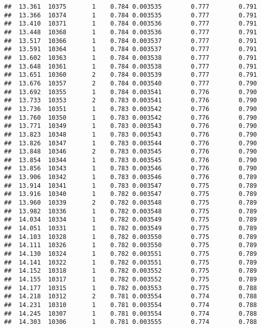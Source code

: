 \documentclass[
]{book}
\begin{document}
\begin{verbatim}
##  13.361  10375       1    0.784 0.003535        0.777        0.791
##  13.366  10374       1    0.784 0.003535        0.777        0.791
##  13.410  10371       1    0.784 0.003536        0.777        0.791
##  13.448  10368       1    0.784 0.003536        0.777        0.791
##  13.517  10366       1    0.784 0.003537        0.777        0.791
##  13.591  10364       1    0.784 0.003537        0.777        0.791
##  13.602  10363       1    0.784 0.003538        0.777        0.791
##  13.648  10361       1    0.784 0.003538        0.777        0.791
##  13.651  10360       2    0.784 0.003539        0.777        0.791
##  13.676  10357       2    0.784 0.003540        0.777        0.790
##  13.692  10355       1    0.784 0.003541        0.776        0.790
##  13.733  10353       2    0.783 0.003541        0.776        0.790
##  13.736  10351       1    0.783 0.003542        0.776        0.790
##  13.760  10350       1    0.783 0.003542        0.776        0.790
##  13.771  10349       1    0.783 0.003543        0.776        0.790
##  13.823  10348       1    0.783 0.003543        0.776        0.790
##  13.826  10347       1    0.783 0.003544        0.776        0.790
##  13.848  10346       2    0.783 0.003545        0.776        0.790
##  13.854  10344       1    0.783 0.003545        0.776        0.790
##  13.856  10343       1    0.783 0.003546        0.776        0.790
##  13.906  10342       1    0.783 0.003546        0.776        0.789
##  13.914  10341       1    0.783 0.003547        0.775        0.789
##  13.916  10340       1    0.782 0.003547        0.775        0.789
##  13.960  10339       2    0.782 0.003548        0.775        0.789
##  13.982  10336       1    0.782 0.003548        0.775        0.789
##  14.034  10334       1    0.782 0.003549        0.775        0.789
##  14.051  10331       1    0.782 0.003549        0.775        0.789
##  14.103  10328       1    0.782 0.003550        0.775        0.789
##  14.111  10326       1    0.782 0.003550        0.775        0.789
##  14.130  10324       1    0.782 0.003551        0.775        0.789
##  14.141  10322       1    0.782 0.003551        0.775        0.789
##  14.152  10318       1    0.782 0.003552        0.775        0.789
##  14.155  10317       1    0.782 0.003552        0.775        0.789
##  14.177  10315       1    0.782 0.003553        0.775        0.788
##  14.218  10312       2    0.781 0.003554        0.774        0.788
##  14.231  10310       1    0.781 0.003554        0.774        0.788
##  14.245  10307       1    0.781 0.003554        0.774        0.788
##  14.303  10306       1    0.781 0.003555        0.774        0.788

\end{verbatim}
\end{document}
